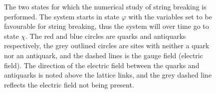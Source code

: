 \documentclass[../main.tex]{subfiles} %
\begin{document}
\begin{figure}[t]
    \caption{The two states for which the numerical study of string breaking is performed. The system starts in state $\varphi$ with the variables set to be favourable for string breaking, thus the system will over time go to state $\chi$. The red and blue circles are quarks and antiquarks respectively, the grey outlined circles are sites with neither a quark nor an antiquark, and the dashed lines is the gauge field (electric field). The direction of the electric field between the quarks and antiquarks is noted above the lattice links, and the grey dashed line reflects the electric field not being present.}
    \label{fig:SystemForNumericalSimulationOfConfinementAndStringBreaking}
\end{figure}
\end{document}
